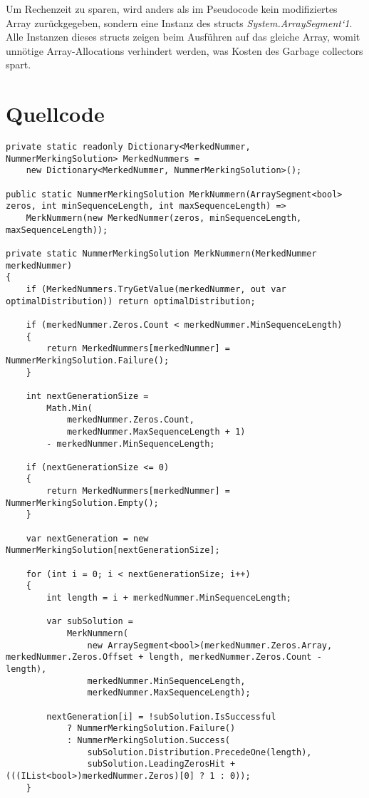 \documentclass[12pt]{article}
\begin{document}
Um Rechenzeit zu sparen, wird anders als im Pseudocode kein modifiziertes Array zurückgegeben, sondern eine Instanz des structs \textit{System.ArraySegment`1}. Alle Instanzen dieses structs zeigen beim Ausführen auf das gleiche Array, womit unnötige Array-Allocations verhindert werden, was Kosten des Garbage collectors spart.

\section{Quellcode}

\begin{lstlisting}
private static readonly Dictionary<MerkedNummer, NummerMerkingSolution> MerkedNummers =
    new Dictionary<MerkedNummer, NummerMerkingSolution>();

public static NummerMerkingSolution MerkNummern(ArraySegment<bool> zeros, int minSequenceLength, int maxSequenceLength) =>
    MerkNummern(new MerkedNummer(zeros, minSequenceLength, maxSequenceLength));

private static NummerMerkingSolution MerkNummern(MerkedNummer merkedNummer)
{
    if (MerkedNummers.TryGetValue(merkedNummer, out var optimalDistribution)) return optimalDistribution;

    if (merkedNummer.Zeros.Count < merkedNummer.MinSequenceLength)
    {
        return MerkedNummers[merkedNummer] = NummerMerkingSolution.Failure();
    }

    int nextGenerationSize =
        Math.Min(
            merkedNummer.Zeros.Count,
            merkedNummer.MaxSequenceLength + 1)
        - merkedNummer.MinSequenceLength;

    if (nextGenerationSize <= 0)
    {
        return MerkedNummers[merkedNummer] = NummerMerkingSolution.Empty();
    }

    var nextGeneration = new NummerMerkingSolution[nextGenerationSize];

    for (int i = 0; i < nextGenerationSize; i++)
    {
        int length = i + merkedNummer.MinSequenceLength;

        var subSolution =
            MerkNummern(
                new ArraySegment<bool>(merkedNummer.Zeros.Array, merkedNummer.Zeros.Offset + length, merkedNummer.Zeros.Count - length),
                merkedNummer.MinSequenceLength,
                merkedNummer.MaxSequenceLength);

        nextGeneration[i] = !subSolution.IsSuccessful
            ? NummerMerkingSolution.Failure()
            : NummerMerkingSolution.Success(
                subSolution.Distribution.PrecedeOne(length),
                subSolution.LeadingZerosHit + (((IList<bool>)merkedNummer.Zeros)[0] ? 1 : 0));
    }


\end{lstlisting}
\end{document}
